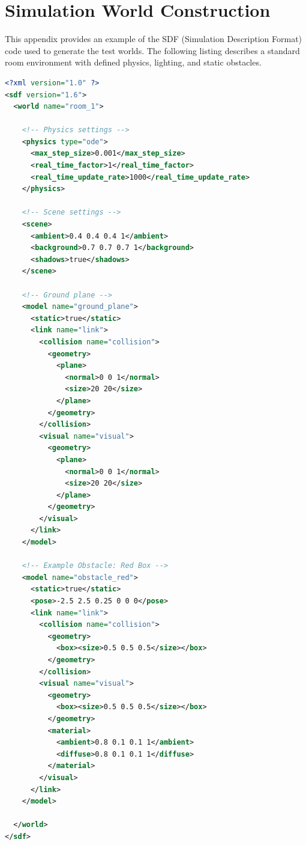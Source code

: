
\chapter{Simulation World Construction}
\label{app:sim_code}

This appendix provides an example of the SDF (Simulation Description Format) code used to generate the test worlds. The following listing describes a standard room environment with defined physics, lighting, and static obstacles.

\begin{lstlisting}[language=XML, caption={SDF World Definition Example (room\_1.sdf)}]
<?xml version="1.0" ?>
<sdf version="1.6">
  <world name="room_1">
    
    <!-- Physics settings -->
    <physics type="ode">
      <max_step_size>0.001</max_step_size>
      <real_time_factor>1</real_time_factor>
      <real_time_update_rate>1000</real_time_update_rate>
    </physics>

    <!-- Scene settings -->
    <scene>
      <ambient>0.4 0.4 0.4 1</ambient>
      <background>0.7 0.7 0.7 1</background>
      <shadows>true</shadows>
    </scene>

    <!-- Ground plane -->
    <model name="ground_plane">
      <static>true</static>
      <link name="link">
        <collision name="collision">
          <geometry>
            <plane>
              <normal>0 0 1</normal>
              <size>20 20</size>
            </plane>
          </geometry>
        </collision>
        <visual name="visual">
          <geometry>
            <plane>
              <normal>0 0 1</normal>
              <size>20 20</size>
            </plane>
          </geometry>
        </visual>
      </link>
    </model>

    <!-- Example Obstacle: Red Box -->
    <model name="obstacle_red">
      <static>true</static>
      <pose>-2.5 2.5 0.25 0 0 0</pose>
      <link name="link">
        <collision name="collision">
          <geometry>
            <box><size>0.5 0.5 0.5</size></box>
          </geometry>
        </collision>
        <visual name="visual">
          <geometry>
            <box><size>0.5 0.5 0.5</size></box>
          </geometry>
          <material>
            <ambient>0.8 0.1 0.1 1</ambient>
            <diffuse>0.8 0.1 0.1 1</diffuse>
          </material>
        </visual>
      </link>
    </model>

  </world>
</sdf>
\end{lstlisting}

